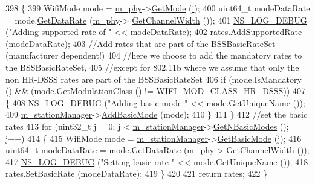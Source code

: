 \begin{DoxyCode}
398     \{
399       WifiMode mode = \hyperlink{classns3_1_1RegularWifiMac_a1a6dad8eb0a057a4e1b459f518457a4c}{m\_phy}->\hyperlink{classns3_1_1WifiPhy_ac35983a13a769a7fbaac43340b8cdaf2}{GetMode} (\hyperlink{bernuolliDistribution_8m_a6f6ccfcf58b31cb6412107d9d5281426}{i});
400       uint64\_t modeDataRate = mode.\hyperlink{classns3_1_1WifiMode_adcfbe150f69da720db23387f733b8a52}{GetDataRate} (\hyperlink{classns3_1_1RegularWifiMac_a1a6dad8eb0a057a4e1b459f518457a4c}{m\_phy}->
      \hyperlink{classns3_1_1WifiPhy_a4a5d5009b3b3308f2baeed42a2007189}{GetChannelWidth} ());
401       \hyperlink{group__logging_ga413f1886406d49f59a6a0a89b77b4d0a}{NS\_LOG\_DEBUG} (\textcolor{stringliteral}{"Adding supported rate of "} << modeDataRate);
402       rates.AddSupportedRate (modeDataRate);
403       \textcolor{comment}{//Add rates that are part of the BSSBasicRateSet (manufacturer dependent!)}
404       \textcolor{comment}{//here we choose to add the mandatory rates to the BSSBasicRateSet,}
405       \textcolor{comment}{//except for 802.11b where we assume that only the non HR-DSSS rates are part of the BSSBasicRateSet}
406       \textcolor{keywordflow}{if} (mode.IsMandatory () && (mode.GetModulationClass () != 
      \hyperlink{namespacens3_aa999e1221606a2b21b1eb33c2007c217a3c847bbae970f2de31e7b4eb7ff49840}{WIFI\_MOD\_CLASS\_HR\_DSSS}))
407         \{
408           \hyperlink{group__logging_ga413f1886406d49f59a6a0a89b77b4d0a}{NS\_LOG\_DEBUG} (\textcolor{stringliteral}{"Adding basic mode "} << mode.GetUniqueName ());
409           \hyperlink{classns3_1_1RegularWifiMac_a76d1a5e27b64bfe36f24a55d1eea2775}{m\_stationManager}->\hyperlink{classns3_1_1WifiRemoteStationManager_a169339a6312b10580cb6a940228833f0}{AddBasicMode} (mode);
410         \}
411     \}
412   \textcolor{comment}{//set the basic rates}
413   \textcolor{keywordflow}{for} (uint32\_t j = 0; j < \hyperlink{classns3_1_1RegularWifiMac_a76d1a5e27b64bfe36f24a55d1eea2775}{m\_stationManager}->\hyperlink{classns3_1_1WifiRemoteStationManager_a1528f837dd70f82cda248f1434b94357}{GetNBasicModes} (); j++)
414     \{
415       WifiMode mode = \hyperlink{classns3_1_1RegularWifiMac_a76d1a5e27b64bfe36f24a55d1eea2775}{m\_stationManager}->\hyperlink{classns3_1_1WifiRemoteStationManager_a8e4599eafc71fa98f6869e3d8908ea24}{GetBasicMode} (j);
416       uint64\_t modeDataRate = mode.\hyperlink{classns3_1_1WifiMode_adcfbe150f69da720db23387f733b8a52}{GetDataRate} (\hyperlink{classns3_1_1RegularWifiMac_a1a6dad8eb0a057a4e1b459f518457a4c}{m\_phy}->
      \hyperlink{classns3_1_1WifiPhy_a4a5d5009b3b3308f2baeed42a2007189}{GetChannelWidth} ());
417       \hyperlink{group__logging_ga413f1886406d49f59a6a0a89b77b4d0a}{NS\_LOG\_DEBUG} (\textcolor{stringliteral}{"Setting basic rate "} << mode.GetUniqueName ());
418       rates.SetBasicRate (modeDataRate);
419     \}
420 
421   \textcolor{keywordflow}{return} rates;
422 \}
\end{DoxyCode}


